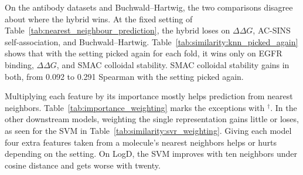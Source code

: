 On the antibody datasets and Buchwald--Hartwig, the two comparisons disagree about where the hybrid wins. At the fixed setting of Table~\ref{tab:nearest_neighbour_prediction}, the hybrid loses on $\Delta\Delta G$, AC-SINS self-association, and Buchwald--Hartwig. Table~\ref{tab:similarity:knn_picked_again} shows that with the setting picked again for each fold, it wins only on EGFR binding, $\Delta\Delta G$, and SMAC colloidal stability. SMAC colloidal stability gains in both, from 0.092 to 0.291 Spearman with the setting picked again.

Multiplying each feature by its importance mostly helps prediction from nearest neighbors. Table~\ref{tab:importance_weighting} marks the exceptions with $^{\dagger}$. In the other downstream models, weighting the single representation gains little or loses, as seen for the SVM in Table~\ref{tab:similarity:svr_weighting}. Giving each model four extra features taken from a molecule's nearest neighbors helps or hurts depending on the setting. On LogD, the SVM improves with ten neighbors under cosine distance and gets worse with twenty.


